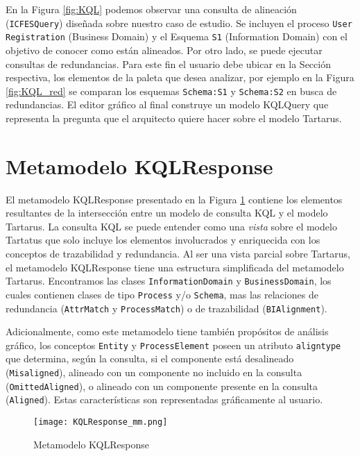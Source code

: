 En la Figura \ref{fig:KQL} podemos observar una consulta de alineaci\'on (\texttt{ICFESQuery}) dise\~nada sobre nuestro caso de estudio. Se incluyen el proceso \texttt{User Registration} (Business Domain) y el Esquema \texttt{S1} (Information Domain) con el objetivo de conocer como est\'an alineados. Por otro lado, se puede ejecutar consultas de redundancias. Para este fin el usuario debe ubicar en la Secci\'on respectiva, los elementos de la paleta que desea analizar, por ejemplo en la Figura \ref{fig:KQL_red} se comparan los esquemas \texttt{Schema:S1} y \texttt{Schema:S2} en busca de redundancias. El editor gr\'afico al final construye un modelo KQLQuery que representa la pregunta que el arquitecto quiere hacer sobre el modelo Tartarus.

\section{Metamodelo KQLResponse}

El metamodelo KQLResponse presentado en la Figura \ref{fig:KQLResponse_mm} contiene los elementos resultantes de la intersecci\'on entre un modelo de consulta KQL y el modelo Tartarus. La consulta KQL se puede entender como una \textit{vista} sobre el modelo Tartatus que solo incluye los elementos involucrados y enriquecida con los conceptos de trazabilidad y redundancia. Al ser una vista parcial sobre Tartarus, el metamodelo KQLResponse tiene una estructura simplificada del metamodelo Tartarus. Encontramos las clases \texttt{InformationDomain} y \texttt{BusinessDomain}, los cuales contienen clases de tipo \texttt{Process} y/o \texttt{Schema}, mas las relaciones de redundancia (\texttt{AttrMatch} y \texttt{ProcessMatch}) o de trazabilidad (\texttt{BIAlignment}). 

Adicionalmente, como este metamodelo tiene tambi\'en prop\'ositos de an\'alisis gr\'afico, los conceptos \texttt{Entity} y \texttt{ProcessElement} poseen un atributo \texttt{aligntype} que determina, seg\'un la consulta, si el componente est\'a desalineado (\texttt{Misaligned}), alineado con un componente no incluido en la consulta (\texttt{OmittedAligned}), o alineado con un componente presente en la consulta (\texttt{Aligned}). Estas caracter\'isticas son representadas gr\'aficamente al usuario.

\begin{figure} [!t]
\begin{center}
	\texttt{[image: KQLResponse\_mm.png]}
	\caption{Metamodelo KQLResponse}
	\label{fig:KQLResponse_mm}
\end{center}	
\end{figure}

